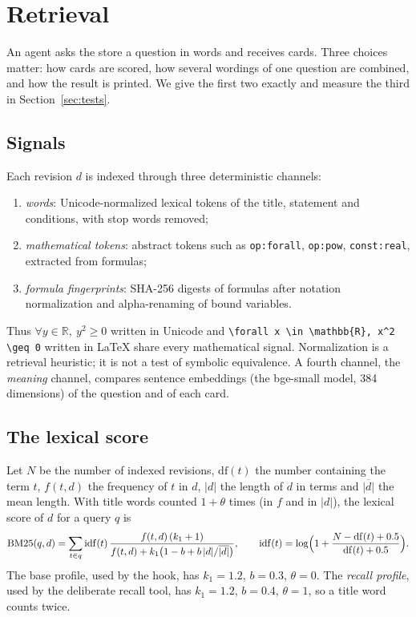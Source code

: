 \section{Retrieval}\label{sec:retrieval}

An agent asks the store a question in words and receives cards. Three choices matter: how cards are scored, how several wordings of one question are combined, and how the result is printed. We give the first two exactly and measure the third in Section~\ref{sec:tests}.

\subsection{Signals}
Each revision $d$ is indexed through three deterministic channels:
\begin{enumerate}[label=(\alph*)]
\item \emph{words}: Unicode-normalized lexical tokens of the title, statement and conditions, with stop words removed;
\item \emph{mathematical tokens}: abstract tokens such as \texttt{op:forall}, \texttt{op:pow}, \texttt{const:real}, extracted from formulas;
\item \emph{formula fingerprints}: SHA-256 digests of formulas after notation normalization and alpha-renaming of bound variables.
\end{enumerate}
Thus $\forall y\in\mathbb{R},\ y^2\ge 0$ written in Unicode and \verb|\forall x \in \mathbb{R}, x^2 \geq 0| written in \LaTeX{} share every mathematical signal. Normalization is a retrieval heuristic; it is not a test of symbolic equivalence. A fourth channel, the \emph{meaning} channel, compares sentence embeddings (the bge-small model, 384 dimensions) of the question and of each card.

\subsection{The lexical score}
Let $N$ be the number of indexed revisions, $\mathrm{df}(t)$ the number containing the term $t$, $f(t,d)$ the frequency of $t$ in $d$, $|d|$ the length of $d$ in terms and $\overline{|d|}$ the mean length. With title words counted $1+\theta$ times (in $f$ and in $|d|$), the lexical score of $d$ for a query $q$ is
\begin{equation}\label{eq:bm25}
\operatorname{BM25}(q,d)=\sum_{t\in q}\operatorname{idf}(t)\,\frac{f(t,d)\,(k_1+1)}{f(t,d)+k_1\bigl(1-b+b\,|d|/\overline{|d|}\bigr)},\qquad \operatorname{idf}(t)=\log\Bigl(1+\frac{N-\mathrm{df}(t)+0.5}{\mathrm{df}(t)+0.5}\Bigr).
\end{equation}
The base profile, used by the hook, has $k_1=1.2$, $b=0.3$, $\theta=0$. The \emph{recall profile}, used by the deliberate recall tool, has $k_1=1.2$, $b=0.4$, $\theta=1$, so a title word counts twice.

